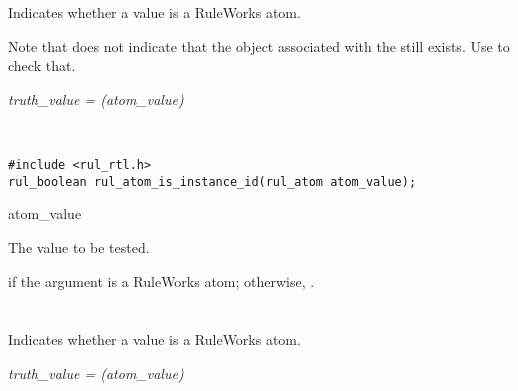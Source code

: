 \section*{}

Indicates whether a value is a RuleWorks  atom.

Note that  does not indicate that the
object associated with the  still exists. Use
 to check that.

\Syntax

\it{truth\_value} = (\it{atom\_value})

\begin{args}
 \\
\end{args}

\CBinding
\begin{verbatim}
#include <rul_rtl.h>
rul_boolean rul_atom_is_instance_id(rul_atom atom_value);
\end{verbatim}

\begin{argument}
\item[atom\_value]

The value to be tested.
\end{argument}


\ReturnValue          

 if the argument is a RuleWorks  atom; otherwise,
.

\begin{seealso}

  
  
  
\end{seealso}
  
\section*{}

Indicates whether a value is a RuleWorks  atom.

\Syntax

\it{truth\_value} = (\it{atom\_value})

